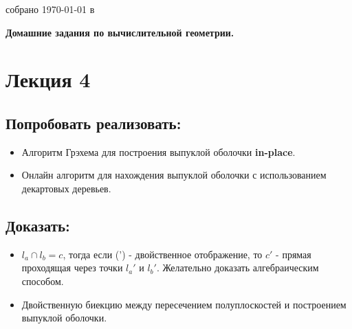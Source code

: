 \documentclass[12pt,a4paper,oneside]{article}
\begin{document}
\begin{flushright}

	{\large собрано {\today} в {\currenttime}}

\end{flushright}

\begin{center}
	{\Large \bf Домашние задания по вычислительной геометрии.}
\end{center}

\section*{Лекция 4}

	\subsection*{Попробовать реализовать:}
	\begin{itemize}
		\item Алгоритм Грэхема для построения выпуклой оболочки \textbf{in-place}.
		\item Онлайн алгоритм для нахождения выпуклой оболочки с использованием декартовых деревьев.
	\end{itemize}
	\subsection*{Доказать:}
	\begin{itemize}
		\item $l_a\cap l_b = c$, тогда если (') - двойственное отображение, то $c'$ - прямая проходящая через точки $l_a'$ и $l_b'$. Желательно доказать алгебраическим способом.
		\item Двойственную биекцию между пересечением полуплоскостей и построением выпуклой оболочки.
	\end{itemize}
\end{document}
